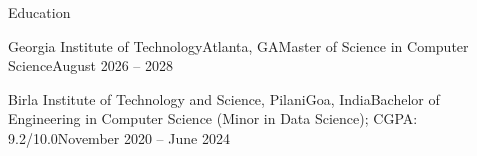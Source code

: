
\begin{rSection}{Education}
    \begin{rTextSubsectionPlain}{Georgia Institute of Technology}{Atlanta, GA}{Master of Science in Computer Science}{August 2026 -- 2028}
    \end{rTextSubsectionPlain}
    \begin{rTextSubsectionPlain}{Birla Institute of Technology and Science, Pilani}{Goa, India}{Bachelor of Engineering in Computer Science (Minor in Data Science); CGPA: 9.2/10.0}{November 2020 -- June 2024}
    \end{rTextSubsectionPlain}
\end{rSection}